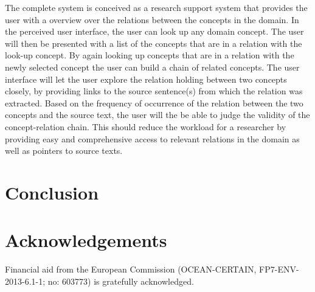 \documentclass[10pt, a4paper]{article}
\begin{document}
The complete system is conceived as a research support system that provides the user with a overview over the relations between the concepts in the domain. 
In the perceived user interface, the user can look up any domain concept.
The user will then be presented with a list of the concepts that are in a relation with the look-up concept. 
By again looking up concepts that are in a relation with the newly selected concept the user can build a chain of related concepts.
The user interface will let the user explore the relation holding between two concepts closely, by providing links to the source sentence(s) from which the relation was extracted. 
Based on the frequency of occurrence of the relation between the two concepts and the source text, the user will the be able to judge the validity of the concept-relation chain.
This should reduce the workload for a researcher by providing easy and comprehensive access to relevant relations in the domain as well as pointers to source texts.

\section{Conclusion}



\section{Acknowledgements}

Financial aid from the European Commission (OCEAN-CERTAIN, FP7-ENV-2013-6.1-1; no: 603773) is gratefully acknowledged. 




\end{document}

